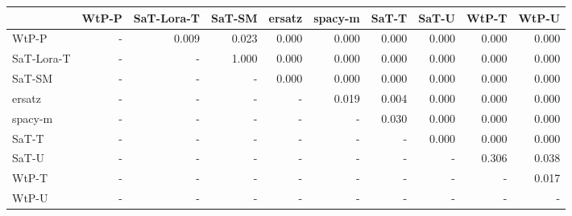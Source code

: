 \begin{tabular}{lrrrrrrrrr}
\toprule
 & WtP-P & SaT-Lora-T & SaT-SM & ersatz & spacy-m & SaT-T & SaT-U & WtP-T & WtP-U \\
\midrule
WtP-P & - & 0.009 & 0.023 & 0.000 & 0.000 & 0.000 & 0.000 & 0.000 & 0.000 \\
SaT-Lora-T & - & - & 1.000 & 0.000 & 0.000 & 0.000 & 0.000 & 0.000 & 0.000 \\
SaT-SM & - & - & - & 0.000 & 0.000 & 0.000 & 0.000 & 0.000 & 0.000 \\
ersatz & - & - & - & - & 0.019 & 0.004 & 0.000 & 0.000 & 0.000 \\
spacy-m & - & - & - & - & - & 0.030 & 0.000 & 0.000 & 0.000 \\
SaT-T & - & - & - & - & - & - & 0.000 & 0.000 & 0.000 \\
SaT-U & - & - & - & - & - & - & - & 0.306 & 0.038 \\
WtP-T & - & - & - & - & - & - & - & - & 0.017 \\
WtP-U & - & - & - & - & - & - & - & - & - \\
\bottomrule
\end{tabular}

